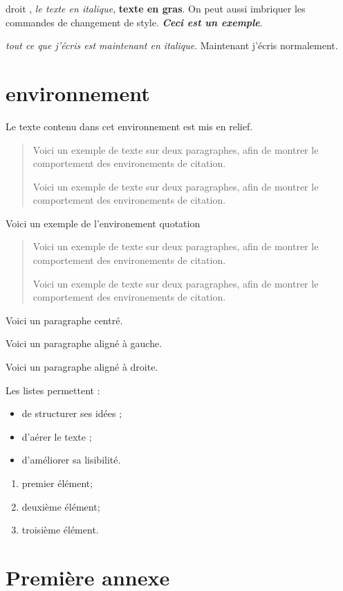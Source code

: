 \documentclass[a4paper,11pt]{article}
\begin{document}
\textup{droit} , \textit{le texte en italique}, \textbf{texte en gras}.
On peut aussi imbriquer les commandes de changement de style. \textit{\textbf{Ceci est un exemple}}.

{\itshape tout ce que j'écris est maintenant en italique}. Maintenant j'écris normalement.

\section{environnement}

\begin{em}
Le texte contenu dans cet environnement est mis en relief.
\end{em}

\begin{quote}
Voici un exemple de texte sur deux paragraphes, afin de montrer le comportement des environements de citation.

Voici un exemple de texte sur deux paragraphes, afin de montrer le comportement des environements de citation.
\end{quote}

Voici un exemple de l'environement quotation


\begin{quotation}
Voici un exemple de texte sur deux paragraphes, afin de montrer le comportement des environements de citation.

Voici un exemple de texte sur deux paragraphes, afin de montrer le comportement des environements de citation.
\end{quotation}

\begin{center}
Voici un paragraphe centré.
\end{center}

\begin{flushleft}
Voici un paragraphe aligné à gauche.
\end{flushleft}

\begin{flushright}
Voici un paragraphe aligné à droite.
\end{flushright}

Les listes permettent :
\begin{itemize}

\item de structurer ses idées ;

\item d'aérer le texte ;

\item d'améliorer sa lisibilité.

\end{itemize}

\begin{enumerate}

\item premier élément;

\item deuxième élément;

\item troisième élément.

\end{enumerate}
\appendix
\section{Première annexe}
\end{document}
